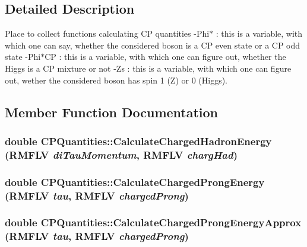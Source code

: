 \subsection{Detailed Description}
Place to collect functions calculating CP quantities -\/Phi$\ast$ : this is a variable, with which one can say, whether the considered boson is a CP even state or a CP odd state -\/Phi$\ast$CP : this is a variable, with which one can figure out, whether the Higgs is a CP mixture or not -\/Zs : this is a variable, with which one can figure out, wether the considered boson has spin 1 (Z) or 0 (Higgs). 

\subsection{Member Function Documentation}
\hypertarget{classCPQuantities_af2aecefa85b7f167105e077382c9c6d0}{
\subsubsection[{CalculateChargedHadronEnergy}]{\setlength{\rightskip}{0pt plus 5cm}double CPQuantities::CalculateChargedHadronEnergy (RMFLV {\em diTauMomentum}, \/  RMFLV {\em chargHad})}}
\label{classCPQuantities_af2aecefa85b7f167105e077382c9c6d0}
\hypertarget{classCPQuantities_ac5089fe60e10d6185702deab951d9d90}{
\subsubsection[{CalculateChargedProngEnergy}]{\setlength{\rightskip}{0pt plus 5cm}double CPQuantities::CalculateChargedProngEnergy (RMFLV {\em tau}, \/  RMFLV {\em chargedProng})}}
\label{classCPQuantities_ac5089fe60e10d6185702deab951d9d90}
\hypertarget{classCPQuantities_a89656a406f278bdda8cadea631bee6aa}{
\subsubsection[{CalculateChargedProngEnergyApprox}]{\setlength{\rightskip}{0pt plus 5cm}double CPQuantities::CalculateChargedProngEnergyApprox (RMFLV {\em tau}, \/  RMFLV {\em chargedProng})}}

